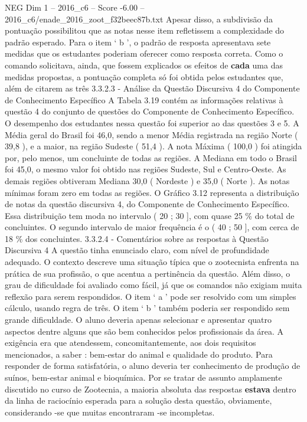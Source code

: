 \begin{textsample}{NEG Dim 1 – 2016\_c6 – Score -6.00 – 2016\_c6/enade\_2016\_zoot\_f32beec87b.txt}
Apesar disso, a subdivisão da pontuação possibilitou que as notas nesse item refletissem a complexidade do padrão esperado.
Para o item ‘ b ’, o padrão de resposta apresentava sete medidas que os estudantes poderiam oferecer como resposta correta.
Como o comando solicitava, ainda, que fossem explicados os efeitos de \textbf{cada} uma das medidas propostas, a pontuação completa só foi obtida pelos estudantes que, além de citarem as três 3.3.2.3 - Análise da Questão Discursiva 4 do Componente de Conhecimento Específico A Tabela 3.19 contém as informações relativas à questão 4 do conjunto de questões do Componente de Conhecimento Específico.
O desempenho dos estudantes nessa questão foi superior ao das questões 3 e 5.
A Média geral do Brasil foi 46,0, sendo a menor Média registrada na região Norte ( 39,8 ), e a maior, na região Sudeste ( 51,4 ).
A nota Máxima ( 100,0 ) foi atingida por, pelo menos, um concluinte de todas as regiões.
A Mediana em todo o Brasil foi 45,0, o mesmo valor foi obtido nas regiões Sudeste, Sul e Centro-Oeste.
As demais regiões obtiveram Mediana 30,0 ( Nordeste ) e 35,0 ( Norte ).
As notas mínimas foram zero em todas as regiões.
O Gráfico 3.12 representa a distribuição de notas da questão discursiva 4, do Componente de Conhecimento Específico.
Essa distribuição tem moda no intervalo ( 20 ; 30 ], com quase 25 \% do total de concluintes.
O segundo intervalo de maior frequência é o ( 40 ; 50 ], com cerca de 18 \% dos concluintes. 3.3.2.4 - Comentários sobre as respostas à Questão Discursiva 4 A questão tinha enunciado claro, com nível de profundidade adequado.
O contexto descreve uma situação típica que o zootecnista enfrenta na prática de sua profissão, o que acentua a pertinência da questão.
Além disso, o grau de dificuldade foi avaliado como fácil, já que os comandos não exigiam muita reflexão para serem respondidos.
O item ‘ a ’ pode ser resolvido com um simples cálculo, usando regra de três.
O item ‘ b ’ também poderia ser respondido sem grande dificuldade.
O aluno deveria apenas selecionar e apresentar quatro aspectos dentre alguns que são bem conhecidos pelos profissionais da área.
A exigência era que atendessem, concomitantemente, aos dois requisitos mencionados, a saber : bem-estar do animal e qualidade do produto.
Para responder de forma satisfatória, o aluno deveria ter conhecimento de produção de suínos, bem-estar animal e bioquímica.
Por se tratar de assunto amplamente discutido no curso de Zootecnia, a maioria absoluta das respostas \textbf{estava} dentro da linha de raciocínio esperada para a solução desta questão, obviamente, considerando -se que muitas encontraram -se incompletas.

\end{textsample}
